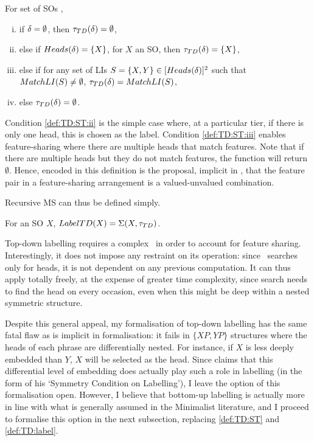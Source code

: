 \begin{definition}\label{def:TD:ST}
    For set of SOs \SD,
    \begin{enumerate}[(i)]

        \item\label{def:TD:ST:i}
            if $\delta = \emptyset$, then $\tau_{TD}(\delta) = \emptyset$,

        \item\label{def:TD:ST:ii}
            else if $Heads(\delta) = \{X\}$, for $X$ an SO, then $\tau_{TD}(\delta) = \{X\}$,

        \item\label{def:TD:ST:iii}
            else if for any set of LIs $S = \{X,Y\} \in [Heads(\delta)]^2$ such that $MatchLI(S) \neq \emptyset$, $\tau_{TD}(\delta) = MatchLI(S)$,

        \item\label{def:TD:ST:iv}
            else $\tau_{TD}(\delta) = \emptyset$.

    \end{enumerate}
\end{definition}

Condition \ref{def:TD:ST:ii} is the simple case where, at a particular tier, if there is only one head, this is chosen as the label. Condition \ref{def:TD:ST:iii} enables feature-sharing where there are multiple heads that match features. Note that if there are multiple heads but they do not match features, the function will return $\emptyset$. Hence, encoded in this definition is the proposal, implicit in \textcite{ChomskyN_2013}, that the feature pair in a feature-sharing arrangement is a valued-unvalued combination.

Recursive MS can thus be defined simply.

\begin{definition}\label{def:TD:label}
    For an SO $X$, $LabelTD(X) = \Sigma(X, \tau_{TD})$.
\end{definition}

Top-down labelling requires a complex \ST\ in order to account for feature sharing. Interestingly, it does not impose any restraint on its operation: since \ST\ searches only for heads, it is not dependent on any previous computation. It can thus apply totally freely, at the expense of greater time complexity, since search needs to find the head on every occasion, even when this might be deep within a nested symmetric structure.

Despite this general appeal, my formalisation of top-down labelling has the same fatal flaw as is implicit in  formalisation: it fails in $\{XP, YP\}$ structures where the heads of each phrase are differentially nested. For instance, if $X$ is less deeply embedded than $Y$, $X$ will be selected as the head. Since \textcite{NakashimaT_2021} claims that this differential level of embedding does actually play such a role in labelling (in the form of his `Symmetry Condition on Labelling'), I leave the option of this formalisation open. However, I believe that bottom-up labelling is actually more in line with what is generally assumed in the Minimalist literature, and I proceed to formalise this option in the next subsection, replacing \autoref{def:TD:ST} and \autoref{def:TD:label}.

